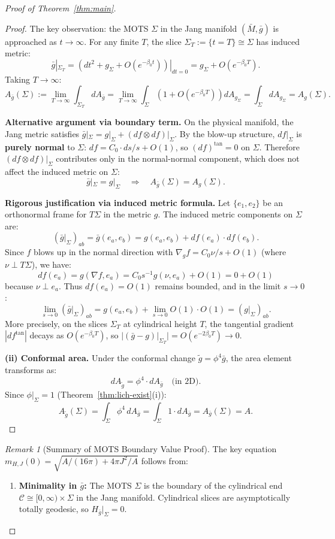 \documentclass[12pt]{article}
\theoremstyle{plain}
\theoremstyle{definition}
\theoremstyle{remark}
\newtheorem{remark}[theorem]{Remark}
\newcommand{\tg}{\tilde{g}}
\newcommand{\bg}{\bar{g}}
\newcommand{\bM}{\bar{M}}
\begin{document}
\begin{proof}[Proof of Theorem~\ref{thm:main}]
\begin{proof}
The key observation: the MOTS $\Sigma$ in the Jang manifold $(\bM, \bg)$ is approached as $t \to \infty$. For any finite $T$, the slice $\Sigma_T := \{t = T\} \cong \Sigma$ has induced metric:
\[
\bg|_{\Sigma_T} = (dt^2 + g_\Sigma + O(e^{-\beta_0 t}))|_{dt=0} = g_\Sigma + O(e^{-\beta_0 T}).
\]
Taking $T \to \infty$:
\[
A_{\bg}(\Sigma) := \lim_{T \to \infty} \int_{\Sigma_T} dA_{\bg} = \lim_{T \to \infty} \int_\Sigma (1 + O(e^{-\beta_0 T})) dA_{g_\Sigma} = \int_\Sigma dA_{g_\Sigma} = A_g(\Sigma).
\]

\textbf{Alternative argument via boundary term.}
On the physical manifold, the Jang metric satisfies $\bg|_{\Sigma} = g|_\Sigma + (df \otimes df)|_\Sigma$. By the blow-up structure, $df|_\Sigma$ is \textbf{purely normal} to $\Sigma$: $df = C_0 \cdot ds/s + O(1)$, so $(df)^{\text{tan}} = 0$ on $\Sigma$. Therefore $(df \otimes df)|_{\Sigma}$ contributes only in the normal-normal component, which does not affect the induced metric on $\Sigma$:
\[
\bg|_\Sigma = g|_\Sigma \quad \Rightarrow \quad A_{\bg}(\Sigma) = A_g(\Sigma).
\]

\textbf{Rigorous justification via induced metric formula.}
Let $\{e_1, e_2\}$ be an orthonormal frame for $T\Sigma$ in the metric $g$. The induced metric components on $\Sigma$ are:
\[
(\bg|_\Sigma)_{ab} = \bg(e_a, e_b) = g(e_a, e_b) + df(e_a) \cdot df(e_b).
\]
Since $f$ blows up in the normal direction with $\nabla_g f = C_0 \nu/s + O(1)$ (where $\nu \perp T\Sigma$), we have:
\[
df(e_a) = g(\nabla f, e_a) = C_0 s^{-1} g(\nu, e_a) + O(1) = 0 + O(1)
\]
because $\nu \perp e_a$. Thus $df(e_a) = O(1)$ remains bounded, and in the limit $s \to 0$:
\[
\lim_{s \to 0} (\bg|_\Sigma)_{ab} = g(e_a, e_b) + \lim_{s \to 0} O(1) \cdot O(1) = (g|_\Sigma)_{ab}.
\]
More precisely, on the slices $\Sigma_T$ at cylindrical height $T$, the tangential gradient $|df^{\text{tan}}|$ decays as $O(e^{-\beta_0 T})$, so $|(\bg - g)|_{\Sigma_T}| = O(e^{-2\beta_0 T}) \to 0$.

\textbf{(ii) Conformal area.}
Under the conformal change $\tg = \phi^4 \bg$, the area element transforms as:
\[
dA_{\tg} = \phi^4 \cdot dA_{\bg} \quad \text{(in 2D)}.
\]
Since $\phi|_\Sigma = 1$ (Theorem~\ref{thm:lich-exist}(i)):
\[
A_{\tg}(\Sigma) = \int_\Sigma \phi^4 \, dA_{\bg} = \int_\Sigma 1 \cdot dA_{\bg} = A_{\bg}(\Sigma) = A.
\]
\end{proof}

\begin{remark}[Summary of MOTS Boundary Value Proof]\label{box:mots-mini-proof}
The key equation $m_{H,J}(0) = \sqrt{A/(16\pi) + 4\pi J^2/A}$ follows from:
\begin{enumerate}[label=\textup{(\arabic*)}, leftmargin=2em, itemsep=1pt]
    \item \textbf{Minimality in $\bg$:} The MOTS $\Sigma$ is the boundary of the cylindrical end $\mathcal{C} \cong [0,\infty) \times \Sigma$ in the Jang manifold. Cylindrical slices are asymptotically totally geodesic, so $H_{\bg}|_\Sigma = 0$.
    

\end{enumerate}
\end{remark}
\end{proof}
\end{document}
